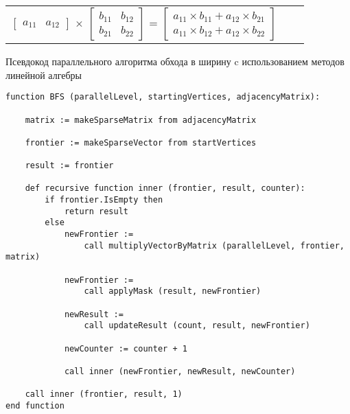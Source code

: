 \begin{center}
    \begin{tabular}{ccc}
        $\begin{bmatrix} a_{11} & a_{12} \end{bmatrix}$
        $\times$
        $\begin{bmatrix} b_{11} & b_{12} \\ b_{21} & b_{22} \end{bmatrix}$
        =
        $\begin{bmatrix} a_{11} \times b_{11} + a_{12} \times b_{21} \\ a_{11} \times b_{12} + a_{12} \times b_{22} \end{bmatrix}$
    \end{tabular}
\end{center}

\lstset{style=codelistingstyle}

\begin{algorithm}[ht]
\caption{Псевдокод параллельного алгоритма обхода в ширину c использованием методов линейной алгебры}
\label{alg:bfs_example}
\begin{lstlisting}[language=pseudoFSharp]
function BFS (parallelLevel, startingVertices, adjacencyMatrix):

    matrix := makeSparseMatrix from adjacencyMatrix
    
    frontier := makeSparseVector from startVertices
    
    result := frontier

    def recursive function inner (frontier, result, counter):
        if frontier.IsEmpty then
            return result
        else
            newFrontier :=
                call multiplyVectorByMatrix (parallelLevel, frontier, matrix)
                
            newFrontier :=
                call applyMask (result, newFrontier)

            newResult :=
                call updateResult (count, result, newFrontier)

            newCounter := counter + 1
            
            call inner (newFrontier, newResult, newCounter)

    call inner (frontier, result, 1)
end function
\end{lstlisting}
\end{algorithm}

